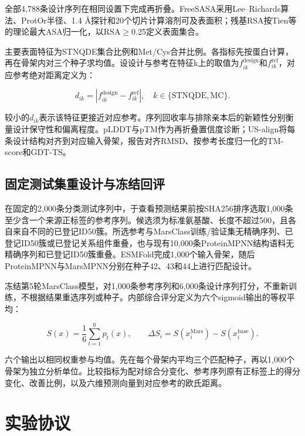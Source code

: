 \documentclass[conference]{IEEEtran}
\begin{document}
全部4,788条设计序列在相同设置下完成再折叠\cite{ref8}。FreeSASA采用Lee--Richards算法、ProtOr半径、1.4 \AA{}探针和20个切片计算溶剂可及表面积\cite{ref9}；残基RSA按Tien等的理论最大ASA归一化\cite{ref10}，以RSA$\geq$0.25定义表面集合。

主要表面特征为STNQDE集合比例和Met/Cys合并比例。各指标先按蛋白计算，再在骨架内对三个种子求均值。设设计与参考在特征k上的取值为$f^{\mathrm{design}}_{ik}$和$f^{\mathrm{ref}}_{ik}$，对应参考绝对距离定义为：

\begin{equation}d_{ik}=\left|f^{\mathrm{design}}_{ik}-f^{\mathrm{ref}}_{ik}\right|,\quad k\in\{\mathrm{STNQDE},\mathrm{MC}\}.\end{equation}

较小的$d_{ik}$表示该特征更接近对应参考。序列回收率与排除亲本后的新颖性分别衡量设计保守性和偏离程度。pLDDT与pTM作为再折叠置信度诊断；US-align将每条设计结构对齐到对应输入骨架，报告对齐RMSD、按参考长度归一化的TM-score和GDT-TS\cite{ref11}。

\subsection{固定测试集重设计与冻结回评}

在固定的2,000条分类测试序列中，于查看预测结果前按SHA256排序选取1,000条至少含一个来源正标签的参考序列。候选须为标准氨基酸、长度不超过500，且各自来自不同的已登记ID50簇。所选参考与MarsClass训练/验证集无精确序列、已登记ID50簇或已登记关系组件重叠，也与现有10,000条ProteinMPNN结构语料无精确序列和已登记ID50簇重叠。ESMFold完成1,000个输入骨架，随后ProteinMPNN与MarsMPNN分别在种子42、43和44上进行匹配设计。

冻结第5轮MarsClass模型，对1,000条参考序列和6,000条设计序列打分，不重新训练，不根据结果重选序列或种子。内部综合评分定义为六个sigmoid输出的等权平均：

\begin{equation}S(x)=\frac{1}{6}\sum_{t=1}^{6}p_t(x),\qquad \Delta S_i=S(x_i^{\mathrm{Mars}})-S(x_i^{\mathrm{base}}).\end{equation}

六个输出以相同权重参与均值。先在每个骨架内平均三个匹配种子，再以1,000个骨架为独立分析单位。比较指标为配对综合分变化、参考序列原有正标签上的得分变化、改善比例，以及六维预测向量到对应参考的欧氏距离。

\section{实验协议}\label{sec:experiments}
\end{document}
